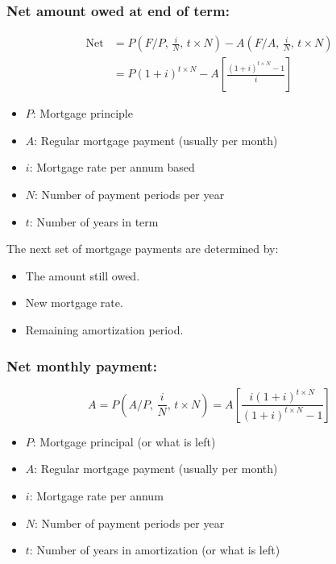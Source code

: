 \subsubsection{Net amount owed at end of term:}
\begin{definition}
    \begin{equation}
        \begin{aligned}
            \text{Net} &= P \left(F/P, \, \frac{i}{N}, \, t \times N\right) - A \left(F/A, \, \frac{i}{N}, \, t \times N\right) \\
                       &= P (1 + i)^{t \times N} - A \left[\frac{(1 + i)^{t \times N} - 1}{i}\right]
        \end{aligned}
    \end{equation}
    \begin{itemize}
        \item $P$: Mortgage principle
        \item $A$: Regular mortgage payment (usually per month)
        \item $i$: Mortgage rate per annum based
        \item $N$: Number of payment periods per year
        \item $t$: Number of years in term
    \end{itemize}
\end{definition}

\begin{intuition}
    The next set of mortgage payments are determined by:
    \begin{itemize}
        \item The amount still owed.
        \item New mortgage rate.
        \item Remaining amortization period.
    \end{itemize}
\end{intuition}

\subsubsection{Net monthly payment:}
\begin{definition}
    \begin{equation}
        A = P \left(A/P, \, \frac{i}{N}, \, t \times N\right) = A \left[\frac{i (1+i)^{t \times N}}{(1+i)^{t \times N} - 1}\right]
    \end{equation}
    \begin{itemize}
        \item $P$: Mortgage principal (or what is left)
        \item $A$: Regular mortgage payment (usually per month)
        \item $i$: Mortgage rate per annum
        \item $N$: Number of payment periods per year
        \item $t$: Number of years in amortization (or what is left)
    \end{itemize}
\end{definition}

